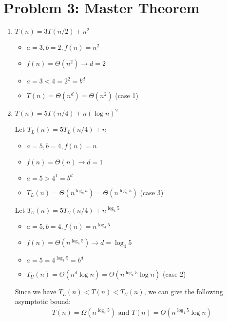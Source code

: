 \documentclass[11pt, a4paper, oneside]{memoir}
\begin{document}
\chapter{Problem 3: Master Theorem}
\begin{enumerate}
    \item \textbf{$T(n) = 3T(n/2) + n^2$}
          \begin{itemize}
              \item $a = 3, b = 2, f(n) = n^2$
              \item $f(n) = \Theta(n^2) \rightarrow d = 2$
              \item $a = 3 < 4 = 2^2 = b^d$
              \item $T(n) = \Theta(n^d) = \Theta(n^2)$ (case 1)
          \end{itemize}

    \item \textbf{$T(n) = 5T(n/4) + n(\log n)^2$}

          Let $T_L(n) = 5T_L(n/4) + n$
          \begin{itemize}
              \item $a = 5, b = 4, f(n) = n$
              \item $f(n) = \Theta(n) \rightarrow d = 1$
              \item $a = 5 > 4^1 = b^d$
              \item $T_L(n) = \Theta(n^{\log_b a}) = \Theta(n^{\log_4 5})$ (case 3)
          \end{itemize}
          Let $T_U(n) = 5T_U(n/4) + n^{\log_4 5}$
          \begin{itemize}
              \item $a = 5, b = 4, f(n) = n^{\log_4 5}$
              \item $f(n) = \Theta(n^{\log_4 5}) \rightarrow d = \log_4 5$
              \item $a = 5 = 4^{\log_4 5} = b^d$
              \item $T_U(n) = \Theta(n^d \log n) = \Theta(n^{\log_4 5} \log n)$ (case 2)
          \end{itemize}
          Since we have $T_L(n) < T(n) < T_U(n)$, we can give the following asymptotic bound:
          \begin{align*}
              T(n) = \Omega(n^{\log_4 5}) \text{ and } T(n) = O(n^{\log_4 5} \log n)
          \end{align*}


\end{enumerate}
\end{document}
